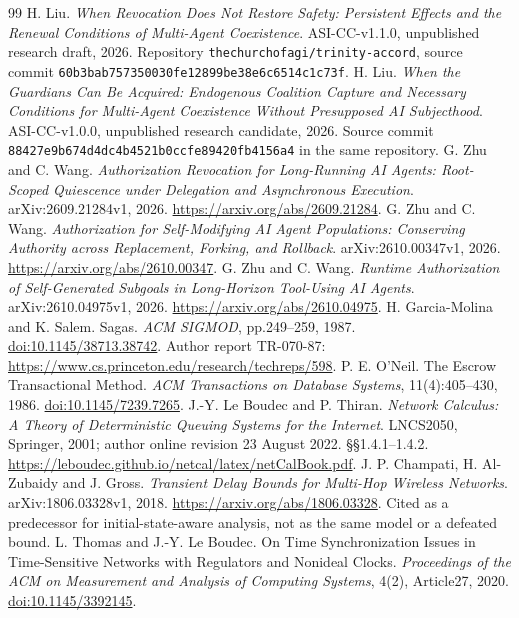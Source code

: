 \begin{thebibliography}{99}\fontsize{9.5}{11}\selectfont\setlength{\itemsep}{2pt}\setlength{\parskip}{0pt}
 H. Liu. \emph{When Revocation Does Not Restore Safety: Persistent Effects and the Renewal Conditions of Multi-Agent Coexistence}. ASI-CC-v1.1.0, unpublished research draft, 2026. Repository \texttt{thechurchofagi/trinity-accord}, source commit \nolinkurl{60b3bab757350030fe12899be38e6c6514c1c73f}.
 H. Liu. \emph{When the Guardians Can Be Acquired: Endogenous Coalition Capture and Necessary Conditions for Multi-Agent Coexistence Without Presupposed AI Subjecthood}. ASI-CC-v1.0.0, unpublished research candidate, 2026. Source commit \nolinkurl{88427e9b674d4dc4b4521b0ccfe89420fb4156a4} in the same repository.
 G. Zhu and C. Wang. \emph{Authorization Revocation for Long-Running AI Agents: Root-Scoped Quiescence under Delegation and Asynchronous Execution}. arXiv:2609.21284v1, 2026. \url{https://arxiv.org/abs/2609.21284}.
 G. Zhu and C. Wang. \emph{Authorization for Self-Modifying AI Agent Populations: Conserving Authority across Replacement, Forking, and Rollback}. arXiv:2610.00347v1, 2026. \url{https://arxiv.org/abs/2610.00347}.
 G. Zhu and C. Wang. \emph{Runtime Authorization of Self-Generated Subgoals in Long-Horizon Tool-Using AI Agents}. arXiv:2610.04975v1, 2026. \url{https://arxiv.org/abs/2610.04975}.
 H. Garcia-Molina and K. Salem. Sagas. \emph{ACM SIGMOD}, pp.249--259, 1987. \href{https://doi.org/10.1145/38713.38742}{doi:10.1145/38713.38742}. Author report TR-070-87: \url{https://www.cs.princeton.edu/research/techreps/598}.
 P. E. O'Neil. The Escrow Transactional Method. \emph{ACM Transactions on Database Systems}, 11(4):405--430, 1986. \href{https://doi.org/10.1145/7239.7265}{doi:10.1145/7239.7265}.
 J.-Y. Le Boudec and P. Thiran. \emph{Network Calculus: A Theory of Deterministic Queuing Systems for the Internet}. LNCS2050, Springer, 2001; author online revision 23 August 2022. \S\S1.4.1--1.4.2. \url{https://leboudec.github.io/netcal/latex/netCalBook.pdf}.
 J. P. Champati, H. Al-Zubaidy and J. Gross. \emph{Transient Delay Bounds for Multi-Hop Wireless Networks}. arXiv:1806.03328v1, 2018. \url{https://arxiv.org/abs/1806.03328}. Cited as a predecessor for initial-state-aware analysis, not as the same model or a defeated bound.
 L. Thomas and J.-Y. Le Boudec. On Time Synchronization Issues in Time-Sensitive Networks with Regulators and Nonideal Clocks. \emph{Proceedings of the ACM on Measurement and Analysis of Computing Systems}, 4(2), Article27, 2020. \href{https://doi.org/10.1145/3392145}{doi:10.1145/3392145}.

\end{thebibliography}
